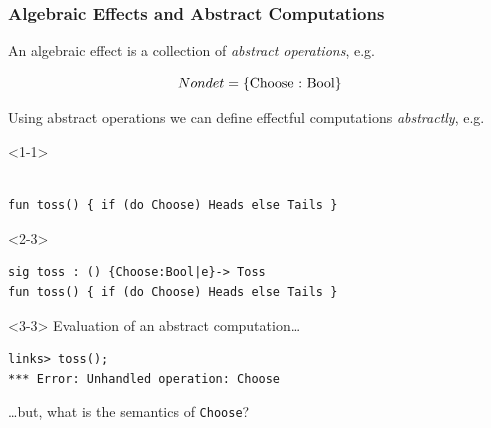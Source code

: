 \documentclass[10pt,compress]{beamer}
\begin{document}
\begin{frame}[fragile]
\frametitle{Algebraic Effects and Abstract Computations}
An algebraic effect is a collection of \emph{abstract operations}, e.g.

\[ 
Nondet = \{\text{\lstinline$Choose : Bool$}\}
\]

Using abstract operations we can define effectful computations \emph{abstractly}, e.g.
\begin{onlyenv}<1-1>
\begin{lstlisting}

fun toss() { if (do Choose) Heads else Tails }
\end{lstlisting}
\end{onlyenv}
%

%
\begin{onlyenv}<2-3>
\begin{lstlisting}
sig toss : () {Choose:Bool|e}-> Toss
fun toss() { if (do Choose) Heads else Tails }
\end{lstlisting}
\end{onlyenv}
%


%


\begin{uncoverenv}<3-3>
Evaluation of an abstract computation\dots
\begin{lstlisting}[style=terminal]
links> toss();
*** Error: Unhandled operation: Choose
\end{lstlisting}
\dots but, what is the semantics of \lstinline$Choose$?
\end{uncoverenv}

\end{frame}
\end{document}
